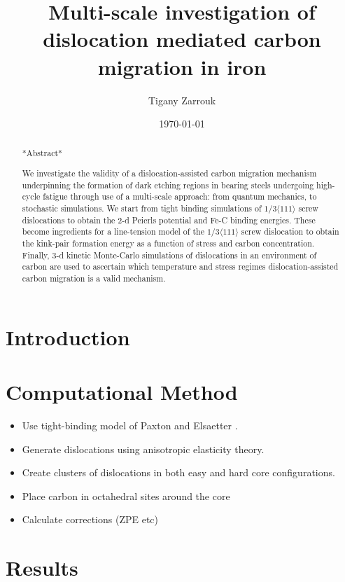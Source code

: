 \documentclass[a4paper]{apa6}
\affiliation{King's College London}
\author{Tigany Zarrouk}
\date{\today}
\title{Multi-scale investigation of dislocation mediated carbon migration in iron}
\begin{document}
\maketitle
\tableofcontents

\begin{abstract}

*Abstract*

We investigate the validity of a dislocation-assisted carbon migration
mechanism underpinning the formation of dark etching regions in
bearing steels undergoing high-cycle fatigue through use of a
multi-scale approach: from quantum mechanics,
to stochastic simulations. We start from tight binding simulations of
$1/3\langle 111 \rangle$ screw dislocations to obtain the 2-d Peierls
potential and Fe-C binding energies. These become ingredients for a line-tension
model of the $1/3\langle 111 \rangle$ screw dislocation to obtain the kink-pair formation
energy as a function of stress and carbon concentration. Finally,
3-d kinetic Monte-Carlo simulations of dislocations in an environment
of carbon are used to ascertain which temperature and stress regimes
dislocation-assisted carbon migration is a valid mechanism. 

\end{abstract}


\section{Introduction}
\label{sec:orgd824988}

\section{Computational Method}
\label{sec:orgd5f5f3c}

\begin{itemize}
\item Use tight-binding model of Paxton and Elsaetter \cite{Paxton2013}.
\item Generate dislocations using anisotropic elasticity theory.
\item Create clusters of dislocations in both easy and hard core
configurations.
\item Place carbon in octahedral sites around the core
\item Calculate corrections (ZPE etc)
\end{itemize}


\section{Results}
\label{sec:orgce3de7e}
\end{document}
